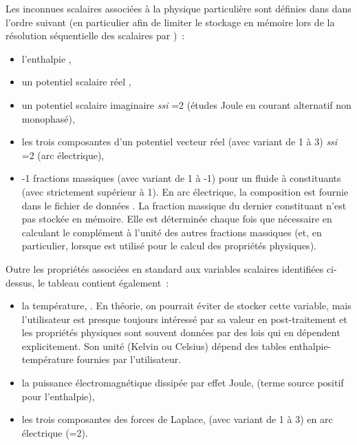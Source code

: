 Les  inconnues scalaires associées à la physique
particulière sont définies dans  dans l'ordre
suivant (en particulier afin de limiter le stockage en mémoire lors de
la résolution séquentielle des
scalaires par )~:
\begin{itemize}
\item l'enthalpie ,
\item un potentiel scalaire réel ,
\item un potentiel scalaire imaginaire  {\it ssi}
          =2 (études Joule en courant alternatif non monophasé),
\item les trois composantes d'un potentiel vecteur réel
           (avec  variant de 1 à 3) {\it ssi}
        =2 (arc électrique),
\item {}-1 fractions massiques 
        (avec  variant de 1 à -1) pour un fluide à 
        constituants (avec  strictement supérieur à 1).
        En arc électrique, la composition est fournie dans le fichier de données
        . La fraction massique du
        dernier constituant n'est pas stockée en mémoire. Elle est
        déterminée chaque fois que nécessaire en calculant le complément à l'unité
        des autres fractions massiques (et, en particulier, lorsque  est
        utilisé pour le calcul des propriétés physiques).
\end{itemize}

\bigskip
Outre les propriétés associées en standard aux variables scalaires
identifiées ci-dessus, le
tableau  contient également~:
 \begin{itemize}
\item la température, . En théorie, on
        pourrait éviter de stocker cette variable, mais l'utilisateur est
        presque toujours intéressé par sa valeur en post-traitement et
        les propriétés physiques sont souvent données par des lois qui en
        dépendent explicitement.
        Son unité (Kelvin ou Celsius) dépend des tables
        enthalpie-température fournies par l'utilisateur.
\item la puissance électromagnétique dissipée par effet Joule,
         (terme source positif pour l'enthalpie),
\item les trois composantes des forces de Laplace,
         (avec  variant de 1 à 3)
        en arc électrique (=2).
\end{itemize}

